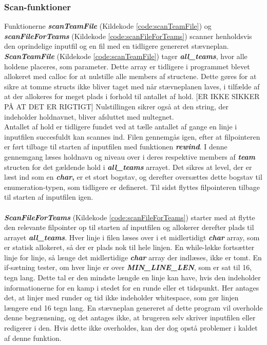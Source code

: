 \subsubsection{Scan-funktioner}
Funktionerne \textbf{\textit{scanTeamFile}} (Kildekode \ref{code:scanTeamFile}) og \textbf{\textit{scanFileForTeams}} (Kildekode \ref{code:scanFileForTeams}) scanner henholdsvis den oprindelige inputfil og en fil med en tidligere genereret stævneplan. \textbf{\textit{ScanTeamFile}} (Kildekode \ref{code:scanTeamFile}) tager \textbf{\textit{all\_teams}}, hvor alle holdene placeres, som parameter. Dette array er tidligere i programmet blevet allokeret med calloc for at nulstille alle members af structene. Dette gøres for at sikre at tomme structs ikke bliver taget med når stævneplanen laves, i tilfælde af at der allokeres for meget plads i forhold til antallet af hold. [ER IKKE SIKKER PÅ AT DET ER RIGTIGT] Nulstillingen sikrer også at den string, der indeholder holdnavnet, bliver afsluttet med nultegnet.
\\
Antallet af hold er tidligere fundet ved at tælle antallet af gange en linje i inputfilen succesfuldt kan scannes ind. Filen gennemgås igen, efter at filpointeren er ført tilbage til starten af inputfilen med funktionen \textbf{\textit{rewind}}. I denne gennemgang læses holdnavn og niveau over i deres respektive members af \textbf{\textit{team}} structen for det gældende hold i \textbf{\textit{all\_teams}} arrayet. Det sikres at level, der er læst ind som en \textbf{\textit{char},} er et stort bogstav, og derefter oversættes dette bogstav til enumeration-typen, som tidligere er defineret. Til sidst flyttes filpointeren tilbage til starten af inputfilen igen.
\\\\
\textbf{\textit{ScanFileForTeams}} (Kildekode \ref{code:scanFileForTeams}) starter med at flytte den relevante filpointer op til starten af inputfilen og allokerer derefter plads til arrayet \textbf{\textit{all\_teams}}. Hver linje i filen læses over i et midlertidigt \textbf{\textit{char}} array, som er statisk allokeret, så der er plads nok til hele linjen. En while-løkke fortsætter linje for linje, så længe det midlertidige \textbf{\textit{char}} array der indlæses, ikke er tomt. En if-sætning tester, om hver linje er over \textbf{\textit{MIN\_LINE\_LEN}}, som er sat til 16, tegn lang. Dette tal er den mindste længde en linje kan have, hvis den indeholder informationerne for en kamp i stedet for en runde eller et tidspunkt. Her antages det, at linjer med runder og tid ikke indeholder whitespace, som gør linjen længere end 16 tegn lang. En stævneplan genereret af dette program vil overholde denne begrænsning, og det antages ikke, at brugeren selv skriver inputfilen eller redigerer i den. Hvis dette ikke overholdes, kan der dog opstå problemer i kaldet af denne funktion. 
